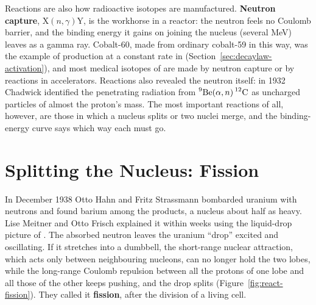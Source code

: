 Reactions are also how radioactive isotopes are manufactured. \textbf{Neutron capture},
$\mathrm X(n,\gamma)\mathrm Y$, is the workhorse in a reactor: the neutron feels no Coulomb barrier, and
the binding energy it gains on joining the nucleus (several MeV) leaves as a gamma ray. Cobalt-60, made
from ordinary cobalt-59 in this way, was the example of production at a constant rate in
 (Section~\ref{sec:decaylaw-activation}), and most medical isotopes of  are made by neutron capture or by
reactions in accelerators. Reactions also revealed the neutron itself: in 1932 Chadwick identified the
penetrating radiation from $\prescript{9}{}{\mathrm{Be}}(\alpha,n)\prescript{12}{}{\mathrm{C}}$ as uncharged particles of almost the
proton's mass. The most important reactions of all, however, are those in which a nucleus splits or two
nuclei merge, and the binding-energy curve says which way each must go.

\section{Splitting the Nucleus: Fission}\label{sec:react-fission}

In December 1938 Otto Hahn and Fritz Strassmann bombarded uranium with neutrons and found barium among
the products, a nucleus about half as heavy. Lise Meitner and Otto Frisch explained it within weeks using
the liquid-drop picture of . The absorbed neutron leaves the uranium ``drop'' excited
and oscillating. If it stretches into a dumbbell, the short-range nuclear attraction, which acts only
between neighbouring nucleons, can no longer hold the two lobes, while the long-range Coulomb repulsion
between all the protons of one lobe and all those of the other keeps pushing, and the drop splits
(Figure~\ref{fig:react-fission}). They called it \textbf{fission}, after the division of a living cell.

\begin{figure}[htbp]\centering
{}
\end{figure}

